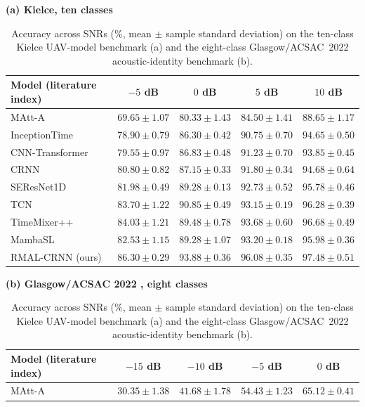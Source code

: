 \begin{table}[t]
\caption{Accuracy across SNRs (\%, mean $\pm$ sample standard deviation) on the ten-class Kielce UAV-model benchmark (a) and the eight-class Glasgow/ACSAC~2022 acoustic-identity benchmark (b).}
\label{tab:comparison}
\centering
\small
\setlength{\tabcolsep}{2pt}
\textbf{(a) Kielce, ten classes}\par\vspace{0.25em}
\begin{tabular}{@{}lcccc@{}}
\toprule
Model (literature index) & $-5$ dB & $0$ dB & $5$ dB & $10$ dB\\
\midrule
MAtt-A \citep{pan2022matt} & $69.65{\pm}1.07$ & $80.33{\pm}1.43$ & $84.50{\pm}1.41$ & $88.65{\pm}1.17$\\
InceptionTime \citep{fawaz2020inceptiontime} & $78.90{\pm}0.79$ & $86.30{\pm}0.42$ & $90.75{\pm}0.70$ & $94.65{\pm}0.50$\\
CNN-Transformer \citep{vaswani2017attention} & $79.55{\pm}0.97$ & $86.83{\pm}0.48$ & $91.23{\pm}0.70$ & $93.85{\pm}0.45$\\
CRNN \citep{cakir2017crnn} & $80.80{\pm}0.82$ & $87.15{\pm}0.33$ & $91.80{\pm}0.34$ & $94.68{\pm}0.64$\\
SEResNet1D \citep{hu2020senet} & $81.98{\pm}0.49$ & $89.28{\pm}0.13$ & $92.73{\pm}0.52$ & $95.78{\pm}0.46$\\
TCN \citep{bai2018tcn} & $83.70{\pm}1.22$ & $90.85{\pm}0.49$ & $93.15{\pm}0.19$ & $96.28{\pm}0.39$\\
TimeMixer++ \citep{wang2025timemixerpp} & $84.03{\pm}1.21$ & $89.48{\pm}0.78$ & $93.68{\pm}0.60$ & $96.68{\pm}0.49$\\
MambaSL \citep{jung2026mambasl} & $82.53{\pm}1.15$ & $89.28{\pm}1.07$ & $93.20{\pm}0.18$ & $95.98{\pm}0.36$\\
RMAL-CRNN (ours) & \textbf{$86.30{\pm}0.29$} & \textbf{$93.88{\pm}0.36$} & \textbf{$96.08{\pm}0.35$} & \textbf{$97.48{\pm}0.51$}\\
\bottomrule
\end{tabular}
\par\vspace{0.65em}
\textbf{(b) Glasgow/ACSAC 2022 \citep{diao2022drone}, eight classes}\par\vspace{0.25em}
\begin{tabular}{@{}lcccc@{}}
\toprule
Model (literature index) & $-15$ dB & $-10$ dB & $-5$ dB & $0$ dB\\
\midrule
MAtt-A \citep{pan2022matt} & $30.35{\pm}1.38$ & $41.68{\pm}1.78$ & $54.43{\pm}1.23$ & $65.12{\pm}0.41$\\

\end{tabular}
\end{table}
